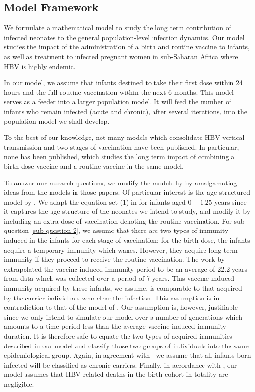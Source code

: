 \subsection{Model Framework}
We formulate a mathematical model to study the long term contribution of infected neonates to the general population-level infection dynamics. Our model studies the  impact of the administration of a birth and routine vaccine to infants, as well as treatment to infected pregnant women in sub-Saharan Africa where HBV is highly endemic.  

In our model, we assume that infants destined to take their first dose within 24 hours and the full routine vaccination within the next 6 months. This model serves as a feeder into a larger population model. It will feed the number of infants who remain infected (acute and chronic),  after several iterations, into the population model we shall develop.

To the best of our knowledge, not many models which consolidate HBV vertical transmission and two stages of vaccination have been published. In particular, none has been published, which studies the long term impact of combining a birth dose vaccine and a routine vaccine in the same model. 

To answer our research questions, we modify the models by \cite{mann2011modelling_NewZealand,zou2010modeling} by amalgamating ideas from the models in those papers. Of particular interest is the age-structured model by \cite{mann2011modelling_NewZealand}. We adapt the equation set (1) in \cite{mann2011modelling_NewZealand} for infants aged $0-1.25$ years since it captures the age structure of the neonates we intend to study, and modify it by including an extra dose of vaccination denoting the routine vaccination. For sub-question \ref{sub question 2}, we assume that there are two types of immunity induced in the infants for each stage of vaccination: for the birth dose, the infants acquire a temporary immunity which wanes. However, they acquire long term immunity if they proceed to receive the routine vaccination. The work by \cite{mclean1994modelling} extrapolated the vaccine-induced immunity period to be an average of 22.2 years from data which was collected over a period of 7 years. This vaccine-induced immunity acquired by these infants, we assume, is comparable to that acquired by the carrier individuals who clear the infection. This assumption is in contradiction to that of the model of \cite{zou2010modeling}. Our assumption is, however, justifiable since we only intend to simulate our model over a number of generations which amounts to a time period less than the average vaccine-induced immunity duration. It is therefore safe to equate the two types of acquired immunities described in our model and classify those two groups of individuals into the same epidemiological group. Again, in agreement with \cite{zhang2012analysisHBVmodel}, we assume that all infants born infected will be classified as chronic carriers. Finally, in accordance with \cite{mann2011modelling_NewZealand}, our model assumes that HBV-related deaths in the birth cohort in totality are negligible.


